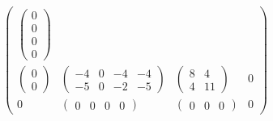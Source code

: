 \begin{Example}{}{}
\[\begin{pmatrix}
\begin{pmatrix}
                                                                  0 \\0\\0\\0
                                                              \end{pmatrix} \\
            \begin{pmatrix}
                0 \\
                0
            \end{pmatrix} & \begin{pmatrix}
                                -4 & 0 & -4 & -4 \\
                                -5 & 0 & -2 & -5
                            \end{pmatrix} & \begin{pmatrix}
                                                8 & 4  \\
                                                4 & 11
                                            \end{pmatrix} & 0                \\
            0               & \begin{pmatrix}
                                  0 & 0 & 0 & 0
                              \end{pmatrix}     & \begin{pmatrix}
                                                      0 & 0 & 0
                                                  \end{pmatrix} & 0
        \end{pmatrix} \]

\end{Example}